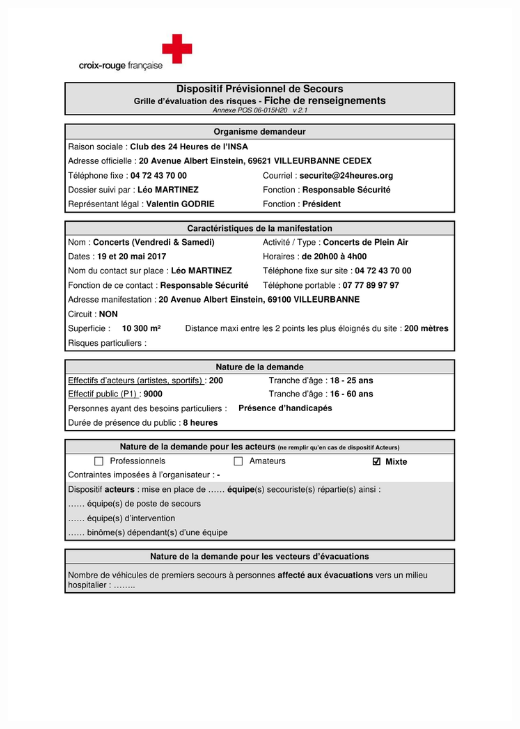 \documentclass[hidelinks, paper=a4, fontsize=13pt]{report}
\begin{document}
\begin{center}
	\includegraphics[scale=0.70, page=2]{Annexes/Documents/Fiche_RIS_Concerts_VS_2017}
\end{center}
\end{document}
